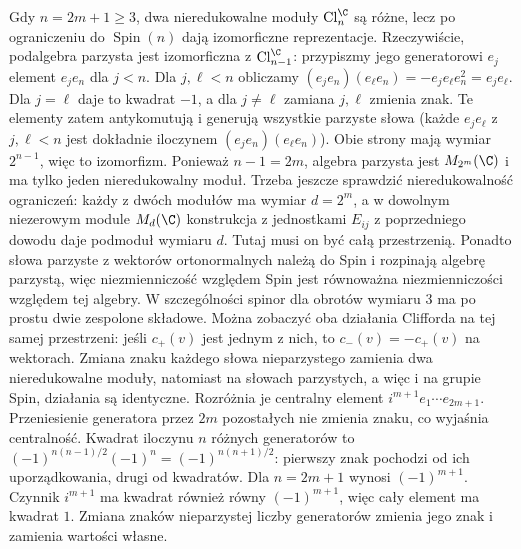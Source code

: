 \begin{uwaga}
Gdy $n=2m+1\geq3$, dwa nieredukowalne moduły
$\operatorname{Cl}^{\C}_n$ są różne, lecz
po ograniczeniu do $\operatorname{Spin}(n)$
dają izomorficzne reprezentacje.
Rzeczywiście, podalgebra parzysta jest
izomorficzna z
$\operatorname{Cl}^{\C}_{n-1}$: przypiszmy
jego generatorowi $e_j$ element $e_je_n$
dla $j<n$. Dla $j,\ell<n$ obliczamy
$(e_je_n)(e_\ell e_n)=-e_je_\ell e_n^2=e_je_\ell$.
Dla $j=\ell$ daje to kwadrat $-1$, a dla $j\ne\ell$
zamiana $j,\ell$ zmienia znak. Te elementy zatem antykomutują i
generują wszystkie parzyste słowa
(każde $e_je_\ell$ z $j,\ell<n$ jest dokładnie
iloczynem $(e_je_n)(e_\ell e_n)$). Obie strony mają
wymiar $2^{n-1}$, więc to izomorfizm.
Ponieważ $n-1=2m$, algebra parzysta jest
$M_{2^m}(\C)$ i ma tylko jeden nieredukowalny
moduł. Trzeba jeszcze sprawdzić nieredukowalność ograniczeń:
każdy z dwóch modułów ma wymiar $d=2^m$, a w dowolnym
niezerowym module $M_d(\C)$ konstrukcja z jednostkami $E_{ij}$
z poprzedniego dowodu daje podmoduł wymiaru $d$.
Tutaj musi on być całą przestrzenią. Ponadto słowa parzyste
z wektorów ortonormalnych należą do Spin i rozpinają algebrę
parzystą, więc niezmienniczość względem Spin jest równoważna
niezmienniczości względem tej algebry.
W szczególności spinor dla obrotów
wymiaru $3$ ma po prostu dwie zespolone składowe.
Można zobaczyć oba działania Clifforda na tej samej przestrzeni:
jeśli $c_+(v)$ jest jednym z nich, to $c_-(v)=-c_+(v)$
na wektorach. Zmiana znaku każdego słowa nieparzystego
zamienia dwa nieredukowalne moduły, natomiast na słowach
parzystych, a więc i na grupie Spin, działania są identyczne.
Rozróżnia je centralny element
$i^{m+1}e_1\cdots e_{2m+1}$.
Przeniesienie generatora przez $2m$ pozostałych nie zmienia
znaku, co wyjaśnia centralność.
Kwadrat iloczynu $n$ różnych generatorów to
$(-1)^{n(n-1)/2}(-1)^n=(-1)^{n(n+1)/2}$:
pierwszy znak pochodzi od ich uporządkowania, drugi od kwadratów.
Dla $n=2m+1$ wynosi $(-1)^{m+1}$.
Czynnik $i^{m+1}$ ma kwadrat również równy $(-1)^{m+1}$,
więc cały element ma kwadrat $1$.
Zmiana znaków nieparzystej liczby generatorów zmienia jego znak
i zamienia wartości własne.
\end{uwaga}

